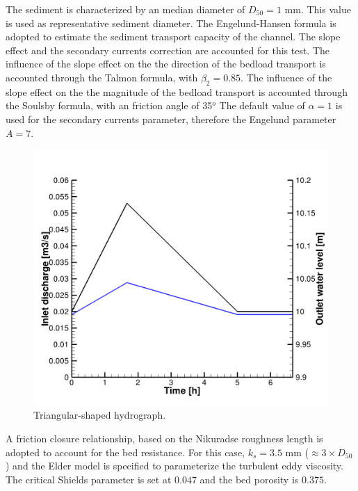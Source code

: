 The sediment is characterized by an median diameter of $D_{50}=1$ mm. This value is used as representative sediment diameter. 
 The Engelund-Hansen formula is adopted to estimate the sediment transport capacity of the channel. The slope effect and the 
secondary currents correction are accounted for this test. The influence of the slope effect on the the direction of the bedload 
transport is accounted through the Talmon formula, with $\beta_2=0.85$. 
The influence of the slope effect on the the magnitude of the bedload transport is accounted through the Soulsby formula, with 
an friction angle of 35$^o$
The default value of $\alpha=1$ is used for the secondary currents parameter, therefore the Engelund parameter $A=7$. 

\begin{figure} [!h]
\centering
\includegraphics[width=.96\textwidth]{../img/yen_boundaries.png}
\caption{Triangular-shaped hydrograph.}\label{fig:hydro}
\end{figure}

A friction closure relationship, based on the Nikuradse roughness length is adopted to
account for the bed resistance. For this case, $k_s=3.5$ mm ($\approx 3\times D_{50}$) and the Elder model is specified to 
parameterize the turbulent eddy viscosity. 
The critical Shields parameter is set at $0.047$ and the bed porosity is $0.375$.


%
%
